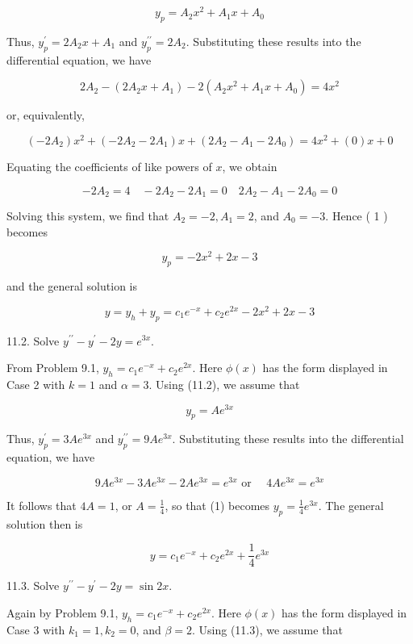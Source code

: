 \documentclass[10pt]{article}
\begin{document}
\begin{equation*}
y_{p}=A_{2} x^{2}+A_{1} x+A_{0} \tag{1}
\end{equation*}


Thus, $y_{p}^{\prime}=2 A_{2} x+A_{1}$ and $y_{p}^{\prime \prime}=2 A_{2}$. Substituting these results into the differential equation, we have

$$
2 A_{2}-\left(2 A_{2} x+A_{1}\right)-2\left(A_{2} x^{2}+A_{1} x+A_{0}\right)=4 x^{2}
$$

or, equivalently,

$$
\left(-2 A_{2}\right) x^{2}+\left(-2 A_{2}-2 A_{1}\right) x+\left(2 A_{2}-A_{1}-2 A_{0}\right)=4 x^{2}+(0) x+0
$$

Equating the coefficients of like powers of $x$, we obtain

$$
-2 A_{2}=4 \quad-2 A_{2}-2 A_{1}=0 \quad 2 A_{2}-A_{1}-2 A_{0}=0
$$

Solving this system, we find that $A_{2}=-2, A_{1}=2$, and $A_{0}=-3$. Hence ( 1 ) becomes

$$
y_{p}=-2 x^{2}+2 x-3
$$

and the general solution is

$$
y=y_{h}+y_{p}=c_{1} e^{-x}+c_{2} e^{2 x}-2 x^{2}+2 x-3
$$

11.2. Solve $y^{\prime \prime}-y^{\prime}-2 y=e^{3 x}$.

From Problem 9.1, $y_{h}=c_{1} e^{-x}+c_{2} e^{2 x}$. Here $\phi(x)$ has the form displayed in Case 2 with $k=1$ and $\alpha=3$. Using (11.2), we assume that


\begin{equation*}
y_{p}=A e^{3 x} \tag{1}
\end{equation*}


Thus, $y_{p}^{\prime}=3 A e^{3 x}$ and $y_{p}^{\prime \prime}=9 A e^{3 x}$. Substituting these results into the differential equation, we have

$$
9 A e^{3 x}-3 A e^{3 x}-2 A e^{3 x}=e^{3 x} \text { or } \quad 4 A e^{3 x}=e^{3 x}
$$

It follows that $4 A=1$, or $A=\frac{1}{4}$, so that (1) becomes $y_{p}=\frac{1}{4} e^{3 x}$. The general solution then is

$$
y=c_{1} e^{-x}+c_{2} e^{2 x}+\frac{1}{4} e^{3 x}
$$

11.3. Solve $y^{\prime \prime}-y^{\prime}-2 y=\sin 2 x$.

Again by Problem 9.1, $y_{h}=c_{1} e^{-x}+c_{2} e^{2 x}$. Here $\phi(x)$ has the form displayed in Case 3 with $k_{1}=1, k_{2}=0$, and $\beta=2$. Using (11.3), we assume that
\end{document}
